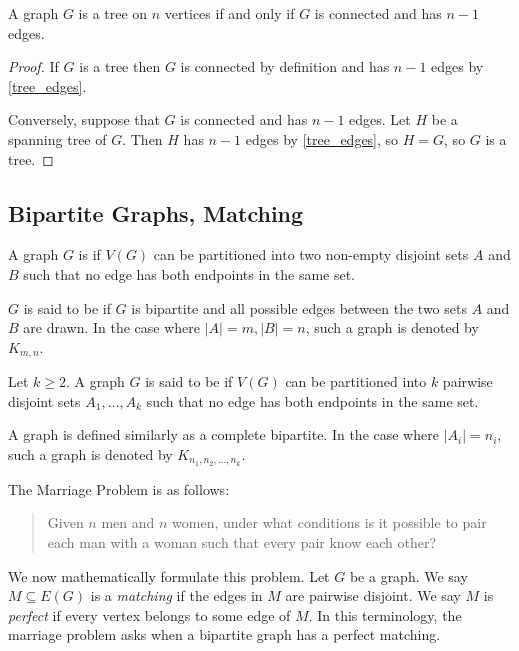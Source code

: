 \begin{lemma}
A graph $G$ is a tree on $n$ vertices if and only if $G$ is connected and has $n-1$ edges.
\end{lemma}

\begin{proof}
If $G$ is a tree then $G$ is connected by definition and has $n-1$ edges by \cref{tree_edges}. 

Conversely, suppose that $G$ is connected and has $n-1$ edges. Let $H$ be a spanning tree of $G$. Then $H$ has $n-1$ edges by \cref{tree_edges}, so $H = G$, so $G$ is a tree.
\end{proof}

\subsection{Bipartite Graphs, Matching}
\begin{definition}
A graph $G$ is  if $V(G)$ can be partitioned into two non-empty disjoint sets $A$ and $B$ such that no edge has both endpoints in the same set.

$G$ is said to be  if $G$ is bipartite and all possible edges between the two sets $A$ and $B$ are drawn. In the case where $|A|=m, |B|=n$, such a graph is denoted by $K_{m,n}$.

Let $k \ge 2$. A graph $G$ is said to be  if $V(G)$ can be partitioned into $k$ pairwise disjoint sets $A_1, \dots, A_k$ such that no edge has both endpoints in the same set.

A  graph is defined similarly as a complete bipartite. In the case where $|A_i| = n_i$, such a graph is denoted by $K_{n_1,n_2,\dots,n_k}$.
\end{definition}

The Marriage Problem is as follows:

\begin{quote}
Given $n$ men and $n$ women, under what conditions is it possible to pair each man with a woman such that every pair know each other?
\end{quote}

We now mathematically formulate this problem. Let $G$ be a graph. We say $M\subseteq E(G)$ is a \emph{matching} if the edges in $M$ are pairwise disjoint. We say $M$ is \emph{perfect} if every vertex belongs to some edge of $M$. 
In this terminology, the marriage problem asks when a bipartite graph has a perfect matching.

